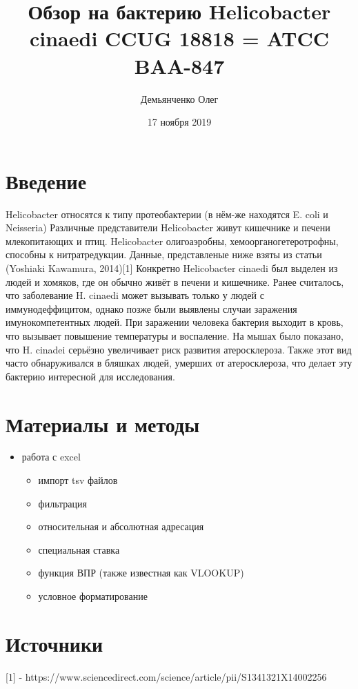 \documentclass{article}
\title{Обзор на бактерию Helicobacter cinaedi CCUG 18818 = ATCC BAA-847}
\date{17 ноября 2019}
\author{Демьянченко Олег}
\begin{document}
\maketitle
\section{Введение}
Helicobacter относятся к типу протеобактерии (в нём-же находятся E. coli и Neisseria)
Различные представители Helicobacter живут кишечнике и печени млекопитающих и птиц.
Helicobacter олигоаэробны, хемоорганогетеротрофны, способны к нитратредукции.\newline
Данные, представленые ниже взяты из статьи (Yoshiaki Kawamura, 2014)[1]
Конкретно Helicobacter cinaedi был выделен из людей и хомяков, где он обычно живёт в печени и кишечнике.
Ранее считалось, что заболевание H. cinaedi может вызывать только у людей с иммунодеффицитом, однако позже были выявлены случаи заражения имунокомпетентных людей.
При заражении человека бактерия выходит в кровь, что вызывает повышение температуры и воспаление.
На мышах было показано, что H. cinadei серьёзно увеличивает риск развития атеросклероза.
Также этот вид часто обнаруживался в бляшках людей, умерших от атеросклероза, что делает эту бактерию интересной для исследования. 
\section{Материалы и методы}
\begin{itemize}
\item{работа с excel}
\begin{itemize}
\item{импорт tsv файлов}
\item{фильтрация}
\item{относительная и абсолютная адресация}
\item{специальная ставка}
\item{функция ВПР (также известная как VLOOKUP)}
\item{условное форматирование}
\end{itemize}
\end{itemize}

\section{Источники}
[1] - https://www.sciencedirect.com/science/article/pii/S1341321X14002256
\end{document}
